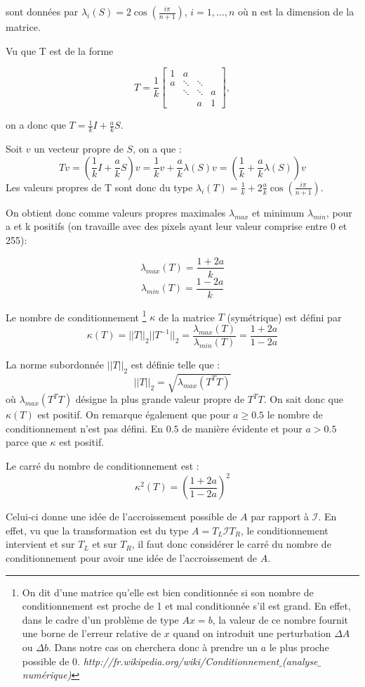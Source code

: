 sont données par $\lambda_i(S) = 2 \cos(\frac{i\pi}{n+1})$, $i= 1, \ldots , n$ où n est la dimension de la matrice.

Vu que T est de la forme

$$
 T = \frac{1}{k}
 \left[
 \begin{array}{cccc}
    1 & a 		& 			& \\
    a & \ddots 	& \ddots 	& \\
      & \ddots 	& \ddots 	& a \\
      & 		& a			& 1
  \end{array}
  \right] ,
$$

on a donc que $T = \frac{1}{k} I + \frac{a}{k} S$.

Soit $v$ un vecteur propre de $S$, on a que :
\begin{equation}
T v = ( \frac{1}{k} I + \frac{a}{k} S ) v = \frac{1}{k} v + \frac{a}{k} \lambda(S) v = (\frac{1}{k} + \frac{a}{k} \lambda(S)) v
\end{equation}
Les valeurs propres de T sont donc du type $\lambda_i(T) = \frac{1}{k} + 2 \frac{a}{k} \cos(\frac{i\pi}{n+1})$.

On obtient donc comme valeurs propres maximales $\lambda_{max}$ et minimum $\lambda_{min}$,
pour a et k positifs (on travaille avec des pixels ayant leur valeur comprise entre 0 et 255):

	$$\lambda_{max} (T) =  \frac{1+2a}{k} $$
	$$\lambda_{min} (T) =  \frac{1-2a}{k} $$

Le nombre de conditionnement
\footnote{On dit d'une matrice qu'elle est bien conditionnée si son nombre de conditionnement
  est proche de 1 et mal conditionnée s'il est grand.
En effet, dans le cadre d'un problème de type $Ax = b$,
la valeur de ce nombre fournit une borne de l'erreur relative de $x$ quand on introduit une perturbation $\Delta A $ ou $\Delta b$.
Dans notre cas on cherchera donc à prendre un $a$ le plus proche possible de 0.
\textit{http://fr.wikipedia.org/wiki/Conditionnement$\_$(analyse$\_$numérique)}}
 $\kappa$ de la matrice $T$ (symétrique) est défini par
\begin{equation}
	\kappa (T) = ||T||_2||T^{-1}||_2 = \frac{\lambda_{max} (T)}{\lambda_{min} (T)} = \frac{1+2a}{1-2a}
\end{equation}

La norme subordonnée $||T||_2$ est définie telle que :
$$||T||_2 = \sqrt{\lambda_{max}(T^TT)}$$
où $\lambda_{max}(T^TT)$ désigne la plus grande valeur propre de $T^TT$.
On sait donc que $\kappa(T) $ est positif.
On remarque également que pour $a \geq 0.5$ le nombre de conditionnement n'est pas défini.
En $0.5$ de manière évidente et pour $a > 0.5$ parce que $\kappa$ est positif.

Le carré du nombre de conditionnement est :
\begin{equation}
	\kappa^2 (T) = (\frac{1+2a}{1-2a})^2
\end{equation}

Celui-ci donne une idée de l'accroissement possible de $A$ par rapport à $\mathcal{I}$.
En effet, vu que la transformation est du type $A = T_L \mathcal{I} T_R$,
le conditionnement intervient et sur $T_L$ et sur $T_R$,
il faut donc considérer le carré du nombre de conditionnement pour avoir une idée de l'accroissement de $A$.

